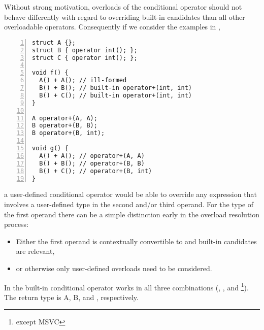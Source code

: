 %

Without strong motivation, overloads of the conditional operator should not behave differently with regard to overriding built-in candidates than all other overloadable operators.
Consequently if we consider the examples in ,
\begin{lstlisting}[style=Vc,numbers=left,float,label=lst:plus overrides,caption={
Some examples of operators overriding built-in candidates
}]
struct A {};
struct B { operator int(); };
struct C { operator int(); };

void f() {
  A() + A(); // ill-formed
  B() + B(); // built-in operator+(int, int)
  B() + C(); // built-in operator+(int, int)
}

A operator+(A, A);
B operator+(B, B);
B operator+(B, int);

void g() {
  A() + A(); // operator+(A, A)
  B() + B(); // operator+(B, B)
  B() + C(); // operator+(B, int)
}
\end{lstlisting}
a user-defined conditional operator would be able to override any expression that involves a user-defined type in the second and/or third operand.
For the type of the first operand there can be a simple distinction early in the overload resolution process:
\begin{itemize}
\item Either the first operand is contextually convertible to \bool and built-in candidates are relevant,
\item or otherwise only user-defined overloads need to be considered.
\end{itemize}
In  the built-in conditional operator works in all three combinations (, , and \footnote{except MSVC}).
The return type is \type A, \type B, and \intt, respectively.

